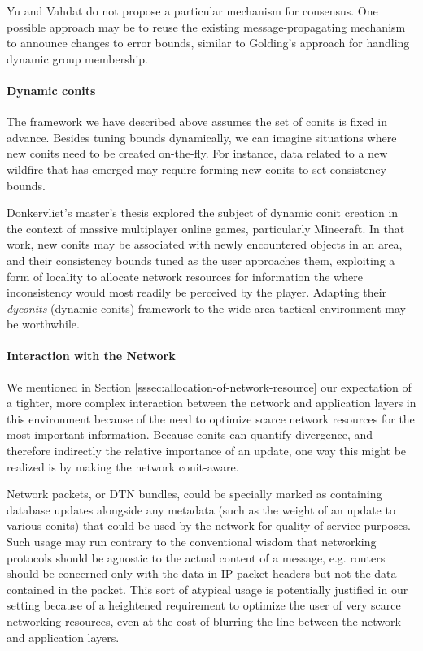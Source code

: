 \documentclass[]             %
{NASA}                       %
\theoremstyle{definition}
\begin{document}
Yu and Vahdat do not propose a particular mechanism for consensus. One
possible approach may be to reuse the existing message-propagating
mechanism to announce changes to error bounds, similar to Golding's
approach for handling dynamic group membership.

\paragraph{Dynamic conits}
The framework we have described above assumes the set of conits is
fixed in advance. Besides tuning bounds dynamically, we can imagine
situations where new conits need to be created on-the-fly. For
instance, data related to a new wildfire that has emerged may require
forming new conits to set consistency bounds.

Donkervliet's master's thesis \citationneeded explored the subject of
dynamic conit creation in the context of massive multiplayer online
games, particularly Minecraft. In that work, new conits may be
associated with newly encountered objects in an area, and their
consistency bounds tuned as the user approaches them, exploiting a
form of locality to allocate network resources for information the
where inconsistency would most readily be perceived by the
player. Adapting their \emph{dyconits} (dynamic conits) framework to
the wide-area tactical environment may be worthwhile.

\paragraph{Interaction with the Network}
We mentioned in Section \ref{sssec:allocation-of-network-resource} our
expectation of a tighter, more complex interaction between the network
and application layers in this environment because of the need to
optimize scarce network resources for the most important
information. Because conits can quantify divergence, and therefore
indirectly the relative importance of an update, one way this might be
realized is by making the network conit-aware.

Network packets, or DTN bundles, could be specially marked as
containing database updates alongside any metadata (such as the weight
of an update to various conits) that could be used by the network for
quality-of-service purposes. Such usage may run contrary to the
conventional wisdom that networking protocols should be agnostic to
the actual content of a message, e.g. routers should be concerned only
with the data in IP packet headers but not the data contained in the
packet. This sort of atypical usage is potentially justified in our
setting because of a heightened requirement to optimize the user of
very scarce networking resources, even at the cost of blurring the
line between the network and application layers.
\end{document}
